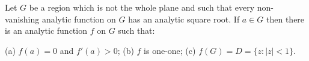 Let $G$ be a region which is not the whole plane and such that every non-vanishing analytic function on $G$ has an analytic square root. If $a \in G$ then there is an analytic function $f$ on $G$ such that:

(a) $f(a) = 0$ and $f'(a) > 0$;
(b) $f$ is one-one;
(c) $f(G) = D = \{z : |z| < 1\}$.